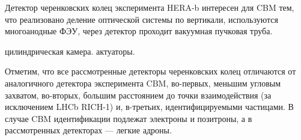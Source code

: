 Детектор черенковских колец эксперимента \mbox{HERA-b} интересен для CBM тем, что реализовано деление оптической системы по вертикали, используются многоанодные ФЭУ, через детектор проходит вакуумная пучковая труба.

\todo цилиндрическая камера. актуаторы.

Отметим, что все рассмотренные детекторы черенковских колец отличаются от аналогичного детектора эксперимента CBM, во-первых, меньшим угловым захватом, во-вторых, большим расстоянием до точки взаимодействия (за исключением LHCb \mbox{RICH-1}) и, в-третьих, идентифицируемыми частицами. В случае CBM идентификации подлежат электроны и позитроны, а в рассмотренных детекторах --- легкие адроны.
